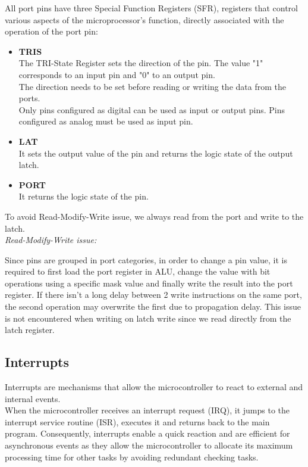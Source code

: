 \noindent
All port pins have three Special Function Registers (SFR), registers that control various aspects of the microprocessor's function, directly associated with the operation of the port pin:
\begin{itemize}
    \item \textbf{TRIS}\\
    The TRI-State Register sets the direction of the pin. The value "1" corresponds to an input pin and "0" to an output pin.\\
    The direction needs to be set before reading or writing the data from the ports. \\
    Only pins configured as digital can be used as input or output pins. Pins configured as analog must be used as input pin.
    \item \textbf{LAT}\\
    It sets the output value of the pin and returns the logic state of the output latch.
    \item \textbf{PORT}\\
    It returns the logic state of the pin. 
\end{itemize}
To avoid Read-Modify-Write issue, we always read from the port and write to the latch.\\

\noindent
\textit{Read-Modify-Write issue:}

\noindent
Since pins are grouped in port categories, in order to change a pin value, it is required to first load the port register in ALU, change the value with bit operations using a specific mask value and finally write the result into the port register. If there isn’t a long delay between 2 write instructions on the same port, the second operation may overwrite the first due to propagation delay. This issue is not encountered when writing on latch write since we read directly from the latch register. 

\subsection{Interrupts}

Interrupts are mechanisms that allow the microcontroller to react to external and internal events.\\
When the microcontroller receives an interrupt request (IRQ), it jumps to the interrupt service routine (ISR), executes it and returns back to the main program. 
Consequently, interrupts enable a quick reaction and are efficient for asynchronous events as they allow the microcontroller to allocate its maximum processing time for other tasks by avoiding redundant checking tasks.\\

